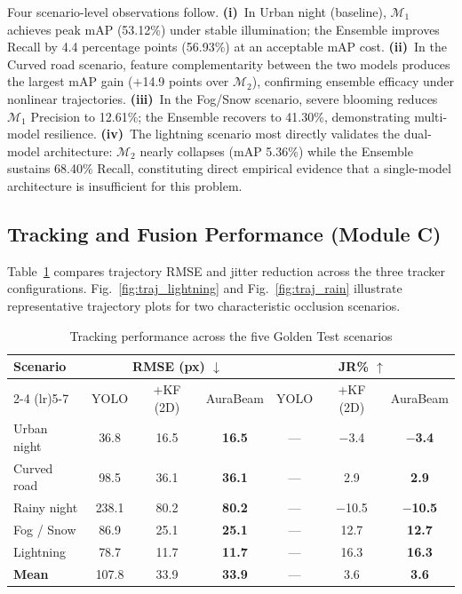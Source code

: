 \documentclass[pdflatex,sn-mathphys-num]{sn-jnl}%
\theoremstyle{thmstyleone}%
\theoremstyle{thmstyletwo}%
\theoremstyle{thmstylethree}%
\begin{document}
Four scenario-level observations follow. \textbf{(i)}~In Urban night
(baseline), $\mathcal{M}_1$ achieves peak mAP (53.12\%) under stable
illumination; the Ensemble improves Recall by 4.4 percentage points
(56.93\%) at an acceptable mAP cost. \textbf{(ii)}~In the Curved road
scenario, feature complementarity between the two models produces the
largest mAP gain ($+$14.9 points over $\mathcal{M}_2$), confirming
ensemble efficacy under nonlinear trajectories. \textbf{(iii)}~In the
Fog/Snow scenario, severe blooming reduces $\mathcal{M}_1$ Precision
to 12.61\%; the Ensemble recovers to 41.30\%, demonstrating
multi-model resilience. \textbf{(iv)}~The lightning scenario most
directly validates the dual-model architecture: $\mathcal{M}_2$
nearly collapses (mAP 5.36\%) while the Ensemble sustains 68.40\%
Recall, constituting direct empirical evidence that a single-model
architecture is insufficient for this problem.

\subsection{Tracking and Fusion Performance (Module C)}
\label{subsec:res_kf}

Table~\ref{tab:tracking_scenarios} compares trajectory RMSE and
jitter reduction across the three tracker configurations.
Fig.~\ref{fig:traj_lightning} and Fig.~\ref{fig:traj_rain} illustrate
representative trajectory plots for two characteristic occlusion
scenarios.

\begin{table}[t]
\centering
\caption{Tracking performance across the five Golden Test scenarios}
\label{tab:tracking_scenarios}

\begin{tabular}{l ccc ccc}
\hline
\multirow{2}{*}{\textbf{Scenario}}
  & \multicolumn{3}{c}{\textbf{RMSE (px) $\downarrow$}}
  & \multicolumn{3}{c}{\textbf{JR\% $\uparrow$}} \\
\cmidrule(lr){2-4} \cmidrule(lr){5-7}
  & YOLO & {+KF (2D)} & {AuraBeam}
  & YOLO & {+KF (2D)} & {AuraBeam} \\
\hline
Urban night    & 36.8  & 16.5 & \textbf{16.5}
               & ---   & $-$3.4  & \textbf{$-$3.4} \\
Curved road    & 98.5  & 36.1 & \textbf{36.1}
               & ---   & 2.9     & \textbf{2.9} \\
Rainy night    & 238.1 & 80.2 & \textbf{80.2}
               & ---   & $-$10.5 & \textbf{$-$10.5} \\
Fog / Snow     & 86.9  & 25.1 & \textbf{25.1}
               & ---   & 12.7    & \textbf{12.7} \\
Lightning      & 78.7  & 11.7 & \textbf{11.7}
               & ---   & 16.3    & \textbf{16.3} \\
\hline
\textbf{Mean}  & 107.8 & 33.9 & \textbf{33.9}
               & ---   & 3.6     & \textbf{3.6} \\
\hline
\end{tabular}
\end{table}
\end{document}
